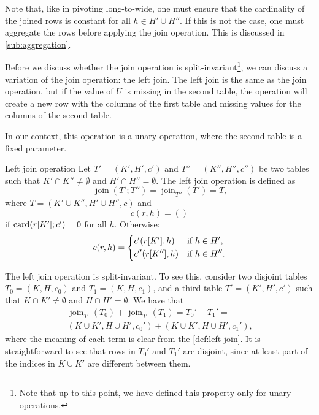 Note that, like in pivoting long-to-wide, one must ensure that the cardinality of the
joined rows is constant for all $h \in H' \cup H''$.  If this is not the case, one must
aggregate the rows before applying the join operation.  This is discussed in
\cref{sub:aggregation}.

Before we discuss whether the join operation is split-invariant\footnote{Note that up to
this point, we have defined this property only for unary operations.}, we can discuss a
variation of the join operation: the left join.  The left join is the same as the join
operation, but if the value of $U$ is missing in the second table, the operation will
create a new row with the columns of the first table and missing values for the columns of
the second table.

In our context, this operation is a unary operation, where the second table is
a fixed parameter.

\begin{definition}{Left join operation}\label{def:left-join}
  Let $T' = (K', H', c')$ and $T'' = (K'', H'', c'')$ be two tables such that $K'
  \cap K'' \neq \emptyset$ and $H' \cap H'' = \emptyset$.  The left join operation is
  defined as \[
    \operatorname{join}(T'; T'') = \operatorname{join}_{T''}(T') = T\text{,}
  \] where $T = (K' \cup K'', H' \cup H'', c)$ and \[
    c(r, h) = ()
  \] if $\rowcard[{r[K']; c'}] = 0$ for all $h$. Otherwise:
  \[
    c(r, h) = \begin{dcases}
      c'(r[K'], h) & \text{if } h \in H'\text{,} \\
      c''(r[K''], h) & \text{if } h \in H''\text{.}
    \end{dcases}
  \]
\end{definition}

The left join operation is split-invariant.  To see this, consider two disjoint tables
$T_0 = (K, H, c_0)$ and $T_1 = (K, H, c_1)$, and a third table $T' = (K', H', c')$ such
that $K \cap K' \neq \emptyset$ and $H \cap H' = \emptyset$.  We have that
\begin{multline*}
  \operatorname{join}_{T'}(T_0) + \operatorname{join}_{T'}(T_1) =
  T_0' + T_1' =\\
    (K \cup K', H \cup H', c_0') + (K \cup K', H \cup H', c_1')\text{,}
\end{multline*}
where the meaning of each term is clear from the \cref{def:left-join}.
It is straightforward to see that rows in $T_0'$ and $T_1'$ are disjoint, since at least
part of the indices in $K \cup K'$ are different between them.

